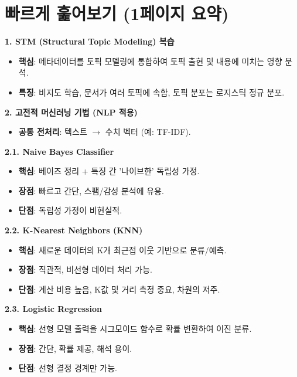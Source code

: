 \documentclass[11pt,a4paper]{article}
\theoremstyle{definition}
\begin{document}
\newpage
\section*{빠르게 훑어보기 (1페이지 요약)}

\begin{tcolorbox}[title=\textbf{CSCI89 Lecture 9: 고전적 머신러닝 핵심 요약}, colback=myblue!10, colframe=blue!75!black, boxrule=0.8pt, arc=4pt]
\textbf{1. STM (Structural Topic Modeling) 복습}
\begin{itemize}
    \item \textbf{핵심}: 메타데이터를 토픽 모델링에 통합하여 토픽 출현 및 내용에 미치는 영향 분석.
    \item \textbf{특징}: 비지도 학습, 문서가 여러 토픽에 속함, 토픽 분포는 로지스틱 정규 분포.
\end{itemize}

\textbf{2. 고전적 머신러닝 기법 (NLP 적용)}
\begin{itemize}
    \item \textbf{공통 전처리}: 텍스트 $\rightarrow$ 수치 벡터 (예: TF-IDF).
\end{itemize}

\textbf{2.1. Naive Bayes Classifier}
\begin{itemize}
    \item \textbf{핵심}: 베이즈 정리 + 특징 간 '나이브한' 독립성 가정.
    \item \textbf{장점}: 빠르고 간단, 스팸/감성 분석에 유용.
    \item \textbf{단점}: 독립성 가정이 비현실적.
\end{itemize}

\textbf{2.2. K-Nearest Neighbors (KNN)}
\begin{itemize}
    \item \textbf{핵심}: 새로운 데이터의 K개 최근접 이웃 기반으로 분류/예측.
    \item \textbf{장점}: 직관적, 비선형 데이터 처리 가능.
    \item \textbf{단점}: 계산 비용 높음, K값 및 거리 측정 중요, 차원의 저주.
\end{itemize}

\textbf{2.3. Logistic Regression}
\begin{itemize}
    \item \textbf{핵심}: 선형 모델 출력을 시그모이드 함수로 확률 변환하여 이진 분류.
    \item \textbf{장점}: 간단, 확률 제공, 해석 용이.
    \item \textbf{단점}: 선형 결정 경계만 가능.
\end{itemize}


\end{tcolorbox}
\end{document}
